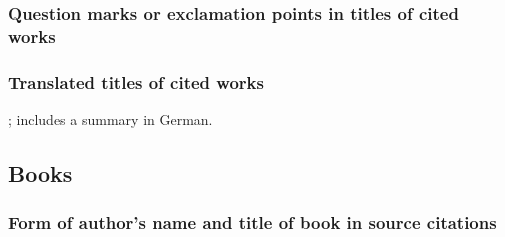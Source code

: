 \documentclass[11pt,letterpaper,oneside]{article}
\begin{document}
\begin{citebib}
\item \cite{vanwagenen1973}
\end{citebib}

\subsubsection{Question marks or exclamation points in titles of cited works}

\begin{citebib}
\item \cite[63]{berra2002}
\item \cite[183]{oram2007}
\item \cite[778]{tessler2014}
\item \cite[336]{batson1990}
\item \cite[55--56]{berra2002}
\item \cite[184]{oram2007}
\item \cite[780]{tessler2014}
\item \cite[337]{batson1990}
\end{citebib}

\setcounter{subsubsection}{98}
\subsubsection{Translated titles of cited works}
\label{14.99}

\begin{citebib}
\item \cite{wereszycki1977}; includes a summary in German.
\item \cite[272]{kern1938}
\item \cite{pirumova1977b}
\item \cite{furet1999}
\end{citebib}

\setcounter{subsection}{4}
\subsection{Books}
\setcounter{subsection}{14}

\setcounter{subsubsection}{100}
\subsubsection{Form of author's name and title of book in source citations}
\end{document}
